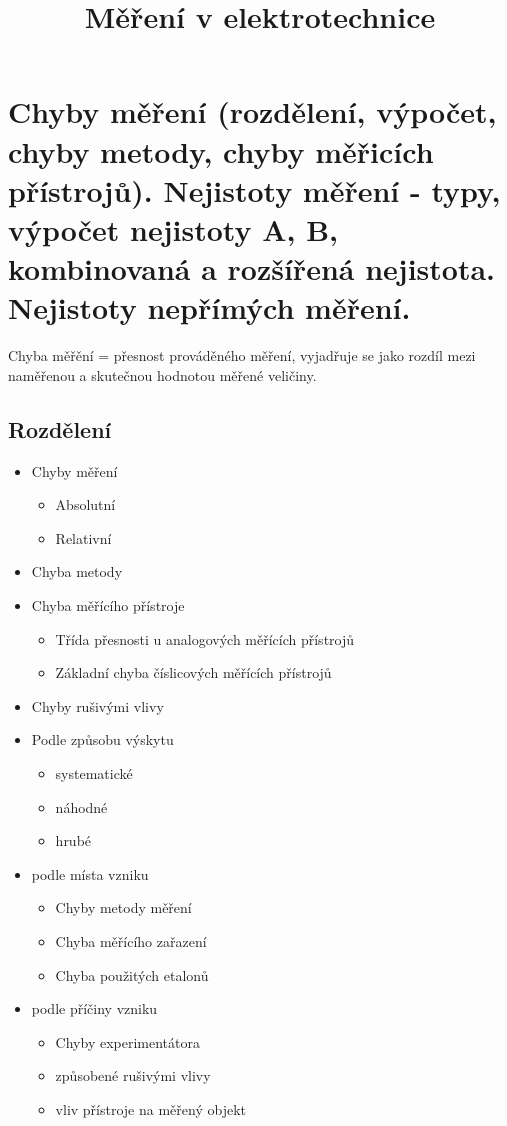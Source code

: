 \title{Měření v elektrotechnice}

\section{Chyby měření (rozdělení, výpočet, chyby metody, chyby měřicích přístrojů). Nejistoty měření - typy, výpočet nejistoty A, B, kombinovaná a rozšířená nejistota. Nejistoty nepřímých měření.}
Chyba měřění = přesnost prováděného měření, vyjadřuje se jako rozdíl mezi naměřenou a skutečnou hodnotou měřené veličiny.
\subsection*{Rozdělení}
\begin{itemize}
    \item Chyby měření
    \begin{itemize}
        \item Absolutní
        \item Relativní
    \end{itemize}
    \item Chyba metody
    \item Chyba měřícího přístroje
        \begin{itemize}
            \item Třída přesnosti u analogových měřících přístrojů
            \item Základní chyba číslicových měřících přístrojů
        \end{itemize}
    \item Chyby rušivými vlivy
    \item Podle způsobu výskytu
        \begin{itemize}
            \item systematické
            \item náhodné
            \item hrubé
        \end{itemize}
    \item podle místa vzniku
        \begin{itemize}
            \item Chyby metody měření
            \item Chyba měřícího zařazení
            \item Chyba použitých etalonů
        \end{itemize}
    \item podle příčiny vzniku
        \begin{itemize}
            \item Chyby experimentátora
            \item způsobené rušivými vlivy
            \item vliv přístroje na měřený objekt
        \end{itemize}
\end{itemize}
\newpage
